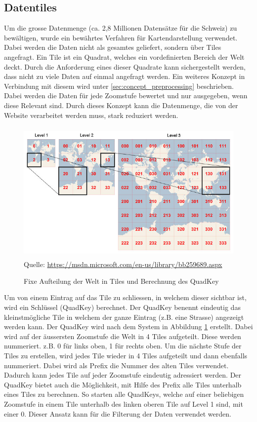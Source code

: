 \subsection{Datentiles}
\label{ch:datentiles}
Um die grosse Datenmenge (ca. 2,8 Millionen Datensätze für die Schweiz) zu bewältigen, wurde ein bewährtes Verfahren für Kartendarstellung verwendet. Dabei werden die Daten nicht als gesamtes geliefert, sondern über Tiles angefragt. Ein Tile ist ein Quadrat, welches ein vordefinierten Bereich der Welt deckt. Durch die Anforderung eines dieser Quadrate kann sichergestellt werden, dass nicht zu viele Daten auf einmal angefragt werden. Ein weiteres Konzept in Verbindung mit diesem wird unter \ref{sec:concept_preprocessing}  beschrieben. Dabei werden die Daten für jede Zoomstufe bewertet und nur ausgegeben, wenn diese Relevant sind. Durch dieses Konzept kann die Datenmenge, die von der Website verarbeitet werden muss, stark reduziert werden.
\begin{figure}[H]
\centering
\includegraphics[height=7cm]{images/BingMapsTileSystem.jpg}
\\Quelle: \href{https://msdn.microsoft.com/en-us/library/bb259689.aspx}{https://msdn.microsoft.com/en-us/library/bb259689.aspx}
\caption{Fixe Aufteilung der Welt in Tiles und Berechnung des QuadKey}
\label{fig:tilesystem}
\end{figure}
\noindent
Um von einem Eintrag auf das Tile zu schliessen, in welchem dieser sichtbar ist, wird ein Schlüssel (QuadKey) berechnet. Der QuadKey benennt eindeutig das kleinstmögliche Tile in welchem der ganze Eintrag (z.B. eine Strasse) angezeigt werden kann. Der QuadKey wird nach dem System in Abbildung \ref{fig:tilesystem} erstellt. Dabei wird auf der äussersten Zoomstufe die Welt in 4 Tiles aufgeteilt. Diese werden nummeriert. z.B. 0 für links oben, 1 für rechts oben. Um die nächste Stufe der Tiles zu erstellen, wird jedes Tile wieder in 4 Tiles aufgeteilt und dann ebenfalls nummeriert. Dabei wird als Prefix die Nummer des alten Tiles verwendet. Dadurch kann jedes Tile auf jeder Zoomstufe eindeutig adressiert werden. Der QuadKey bietet auch die Möglichkeit, mit Hilfe des Prefix alle Tiles unterhalb eines Tiles zu berechnen. So starten alle QuadKeys, welche auf einer beliebigen Zoomstufe in einem Tile unterhalb des linken oberen Tile auf Level 1 sind, mit einer 0. Dieser Ansatz kann für die Filterung der Daten verwendet werden.
